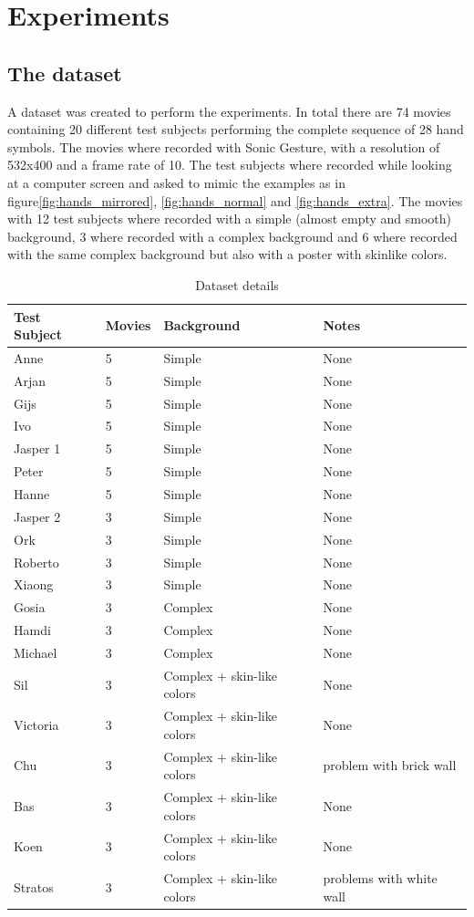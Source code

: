 
\chapter{Experiments}
\label{ch:experiments}


\section{The dataset}
A dataset was created to perform the experiments. In total there are 74 movies containing 20 different test subjects performing the complete sequence of 28 hand symbols. The movies where recorded with Sonic Gesture, with a resolution of 532x400 and a frame rate of 10. The test subjects where recorded while looking at a computer screen and asked to mimic the examples as in figure\ref{fig:hands_mirrored}, \ref{fig:hands_normal} and \ref{fig:hands_extra}. The movies with 12 test subjects where recorded with a simple (almost empty and smooth) background, 3 where recorded with a complex background and 6 where recorded with the same complex background but also with a poster with skinlike colors.

\begin{table}
\centering
\begin{tabular}{llll}
\hline\hline
	Test Subject & Movies & Background & Notes \\
\hline
	Anne     & 5 & Simple & None \\
	Arjan    & 5 & Simple & None \\
	Gijs     & 5 & Simple & None \\
	Ivo      & 5 & Simple & None \\
	Jasper 1 & 5 & Simple & None \\
	Peter    & 5 & Simple & None \\
	Hanne    & 5 & Simple & None \\
	Jasper 2 & 3 & Simple & None \\
	Ork      & 3 & Simple & None \\
	Roberto  & 3 & Simple & None \\
	Xiaong   & 3 & Simple & None \\
	\hline			
	Gosia    & 3 & Complex & None \\
	Hamdi    & 3 & Complex & None \\
	Michael  & 3 & Complex & None \\
	Sil      & 3 & Complex + skin-like colors & None \\
	Victoria & 3 & Complex + skin-like colors & None \\
	Chu      & 3 & Complex + skin-like colors & problem with brick wall \\
	\hline	
	Bas      & 3 & Complex + skin-like colors & None \\
	Koen     & 3 & Complex + skin-like colors & None \\
	Stratos  & 3 & Complex + skin-like colors & problems with white wall \\
\hline
\end{tabular}
\caption{Dataset details}
\end{table}

